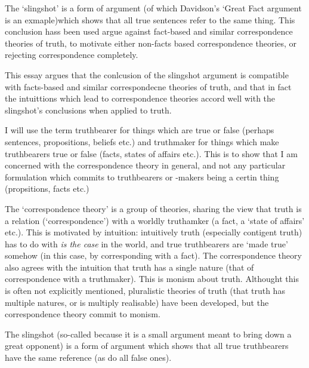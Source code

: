 The `slingshot' is a form of argument (of which Davidson's `Great Fact argument is an exmaple)which shows that all true sentences refer to the same thing.
This conclusion hass been used argue against fact-based and similar correspondence theories of truth, to motivate either non-facts based correspondence theories, or rejecting correspondence completely.

This essay argues that the conlcusion of the slingshot argument is compatible with facts-based and similar correspondecne theories of truth, and that in fact the intuittions which lead to correspondence theories accord well with the slingshot's conclusions when applied to truth.

I will use the term truthbearer for things which are true or false (perhaps sentences, propositions, beliefs etc.) and truthmaker for things which make truthbearers true or false (facts, states of affairs etc.).
This is to show that I am concerned with the correspondence theory in general, and not any particular formulation which commits to truthbearers or -makers being a certin thing (propsitions, facts etc.)

The `correspondence theory' is a group of theories, sharing the view that truth is a relation (`correspondence') with a worldly truthamker (a fact, a `state of affairs' etc.).
This is motivated by intuition: intuitively truth  (especially contigent truth) has to do with \emph{is the case} in the world, and true truthbearers are `made true' somehow (in this case, by corresponding with a fact).
The correspondence theory also agrees with the intuition that truth has a single nature (that of correspondence with a truthmaker). 
This is monism about truth.
Althought this is often not explicitly mentioned, pluralistic theories of truth (that truth has multiple natures, or is multiply realisable) have been developed, but the correspondence theory commit to monism.

The slingshot (so-called because it is a small argument meant to bring down a great opponent) is a form of argument which shows that all true truthbearers have the same reference (as do all false ones).

